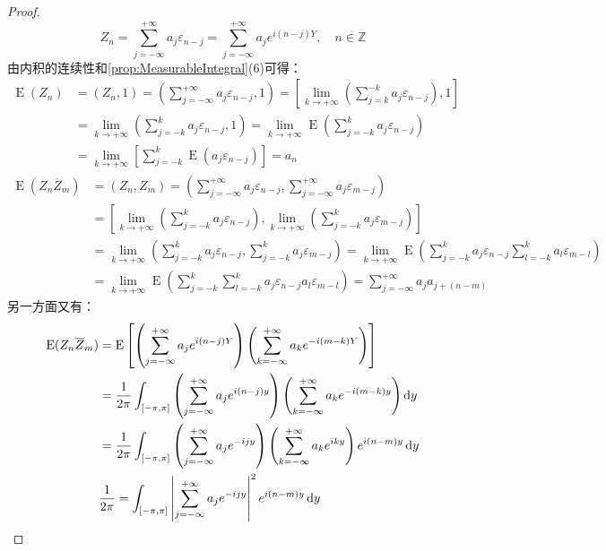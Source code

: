 \begin{proof}
\begin{equation*}
		Z_n=\sum_{j=-\infty}^{+\infty}a_j\varepsilon_{n-j}=\sum_{j=-\infty}^{+\infty}a_je^{i(n-j)Y},\quad n\in\mathbb{Z}
	\end{equation*}
	由内积的连续性和\cref{prop:MeasurableIntegral}(6)可得：
	\begin{align*}
		\operatorname{E}(Z_n)&=(Z_n,1)=\left(\sum_{j=-\infty}^{+\infty}a_j\varepsilon_{n-j},1\right)=\left[\lim_{k\to+\infty}\left(\sum_{j=k}^{-k}a_j\varepsilon_{n-j}\right),1\right] \\
		&=\lim_{k\to+\infty}\left(\sum_{j=-k}^{k}a_j\varepsilon_{n-j},1\right)=\lim_{k\to+\infty}\operatorname{E}\left(\sum_{j=-k}^{k}a_j\varepsilon_{n-j}\right) \\
		&=\lim_{k\to+\infty}\left[\sum_{j=-k}^{k}\operatorname{E}(a_j\varepsilon_{n-j})\right]=a_n
	\end{align*}
	\begin{align*}
		\operatorname{E}(Z_n\overline{Z}_m)&=(Z_n,Z_m)=\left(\sum_{j=-\infty}^{+\infty}a_j\varepsilon_{n-j},\sum_{j=-\infty}^{+\infty}a_j\varepsilon_{m-j}\right) \\
		&=\left[\lim_{k\to+\infty}\left(\sum_{j=-k}^{k}a_j\varepsilon_{n-j}\right),\lim_{k\to+\infty}\left(\sum_{j=-k}^{k}a_j\varepsilon_{m-j}\right)\right] \\
		&=\lim_{k\to+\infty}\left(\sum_{j=-k}^{k}a_j\varepsilon_{n-j},\sum_{j=-k}^{k}a_j\varepsilon_{m-j}\right)=\lim_{k\to+\infty}\operatorname{E}\left(\sum_{j=-k}^{k}a_j\varepsilon_{n-j}\sum_{l=-k}^{k}a_l\varepsilon_{m-l}\right) \\
		&=\lim_{k\to+\infty}\operatorname{E}\left(\sum_{j=-k}^{k}\sum_{l=-k}^{k}a_j\varepsilon_{n-j}a_l\varepsilon_{m-l}\right)=\sum_{j=-\infty}^{+\infty}a_ja_{j+(n-m)} 
	\end{align*}
	另一方面又有：
	\begin{align*}
		\operatorname{E}(Z_n\overline{Z}_m)&=\operatorname{E}\left[\left(\sum_{j=-\infty}^{+\infty}a_je^{i(n-j)Y}\right)\left(\sum_{k=-\infty}^{+\infty}a_ke^{-i(m-k)Y}\right)\right] \\
		&=\frac{1}{2\pi}\int_{[-\pi,\pi]}\left(\sum_{j=-\infty}^{+\infty}a_je^{i(n-j)y}\right)\left(\sum_{k=-\infty}^{+\infty}a_ke^{-i(m-k)y}\right)\mathop{}\!\mathrm{d} y \\
		&=\frac{1}{2\pi}\int_{[-\pi,\pi]}\left(\sum_{j=-\infty}^{+\infty}a_je^{-ijy}\right)\left(\sum_{k=-\infty}^{+\infty}a_ke^{iky}\right)e^{i(n-m)y}\mathop{}\!\mathrm{d} y \\
		&\frac{1}{2\pi}=\int_{[-\pi,\pi]}\left|\sum_{j=-\infty}^{+\infty}a_je^{-ijy}\right|^2e^{i(n-m)y}\mathop{}\!\mathrm{d} y
	\end{align*}

\end{proof}
